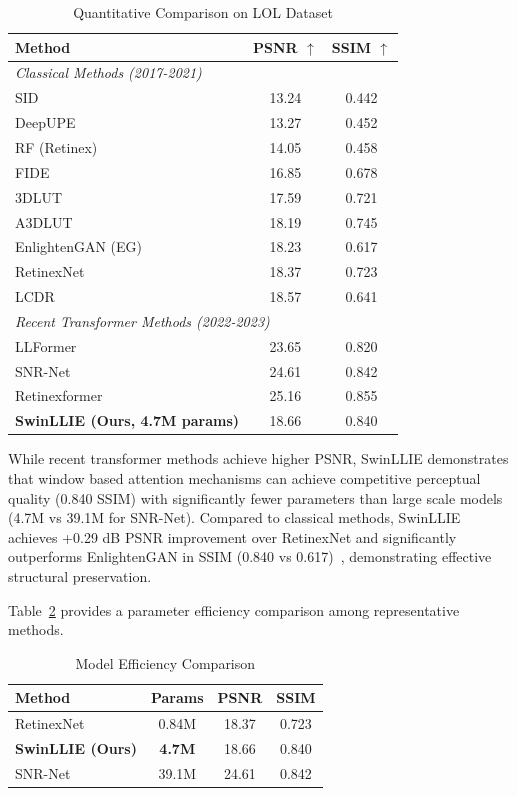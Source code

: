 \documentclass[sigconf]{acmart}
\begin{document}
\begin{table}[htbp]
\caption{Quantitative Comparison on LOL Dataset}
\centering
\begin{tabular}{lcc}
\toprule
\textbf{Method} & \textbf{PSNR $\uparrow$} & \textbf{SSIM $\uparrow$} \\
\midrule
\multicolumn{3}{l}{\textit{Classical Methods (2017-2021)}} \\
SID & 13.24 & 0.442 \\
DeepUPE & 13.27 & 0.452 \\
RF (Retinex) & 14.05 & 0.458 \\
FIDE & 16.85 & 0.678 \\
3DLUT & 17.59 & 0.721 \\
A3DLUT & 18.19 & 0.745 \\
EnlightenGAN (EG) & 18.23 & 0.617 \\
RetinexNet & 18.37 & 0.723 \\
LCDR & 18.57 & 0.641 \\
\midrule
\multicolumn{3}{l}{\textit{Recent Transformer Methods (2022-2023)}} \\
LLFormer~\cite{wang2023llformer} & 23.65 & 0.820 \\
SNR-Net~\cite{xu2022snrnet} & 24.61 & 0.842 \\
Retinexformer~\cite{cai2023retinexformer} & 25.16 & 0.855 \\
\midrule
\textbf{SwinLLIE (Ours, 4.7M params)} & 18.66 & 0.840 \\
\bottomrule
\end{tabular}
\label{tab:results}
\end{table}

While recent transformer methods achieve higher PSNR, SwinLLIE demonstrates that window based attention mechanisms can achieve competitive perceptual quality (0.840 SSIM) with significantly fewer parameters than large scale models (4.7M vs 39.1M for SNR-Net). Compared to classical methods, SwinLLIE achieves +0.29 dB PSNR improvement over RetinexNet and significantly outperforms EnlightenGAN in SSIM (0.840 vs 0.617)~\cite{wang2004ssim}, demonstrating effective structural preservation.

Table~\ref{tab:efficiency} provides a parameter efficiency comparison among representative methods.

\begin{table}[htbp]
\caption{Model Efficiency Comparison}
\centering
\begin{tabular}{lccc}
\toprule
\textbf{Method} & \textbf{Params} & \textbf{PSNR} & \textbf{SSIM} \\
\midrule
RetinexNet & 0.84M & 18.37 & 0.723 \\
\textbf{SwinLLIE (Ours)} & \textbf{4.7M} & 18.66 & 0.840 \\
SNR-Net & 39.1M & 24.61 & 0.842 \\
\bottomrule
\end{tabular}
\label{tab:efficiency}
\end{table}
\end{document}
